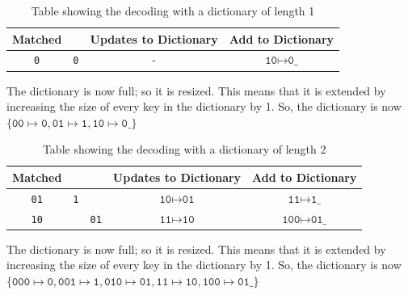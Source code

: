 \documentclass[10pt,\jkfside,a4paper]{article}
\begin{document}
\begin{enumerate}
\begin{enumerate}
\begin{table}[H]
\begin{tabular}{cccc}
                \toprule

                Matched && Updates to Dictionary & Add to Dictionary\\

                \midrule

                \texttt{0} & \texttt{0} & - & $\texttt{10} \mapsto \texttt{0\_}$ \\

                \bottomrule

            \end{tabular}

            \caption{Table showing the decoding with a dictionary of length 1}

        \end{table}

        The dictionary is now full; so it is resized. This means that it is extended by increasing the size of every key in the dictionary by 1. So, the dictionary is now $\{\texttt{00} \mapsto \texttt{0}, \texttt{01} \mapsto \texttt{1}, \texttt{10} \mapsto \texttt{0\_}\}$

        \begin{table}[H]

            \centering

            \begin{tabular}{ccccc}


                \toprule

                Matched &&& Updates to Dictionary & Add to Dictionary\\

                \midrule

                \texttt{01} & \texttt{1} && $\texttt{10} \mapsto \texttt{01}$ & $\texttt{11} \mapsto \texttt{1\_}$ \\

                \texttt{10} && \texttt{01} & $\texttt{11} \mapsto \texttt{10}$ & $\texttt{100} \mapsto \texttt{01\_}$ \\

                \bottomrule

            \end{tabular}

            \caption{Table showing the decoding with a dictionary of length 2}

        \end{table}

        The dictionary is now full; so it is resized. This means that it is extended by increasing the size of every key in the dictionary by 1. So, the dictionary is now $\{\texttt{000} \mapsto \texttt{0}, \texttt{001} \mapsto \texttt{1}, \texttt{010} \mapsto \texttt{01}, \texttt{11} \mapsto \texttt{10}, \texttt{100} \mapsto \texttt{01\_}\}$


\end{enumerate}
\end{enumerate}
\end{document}
